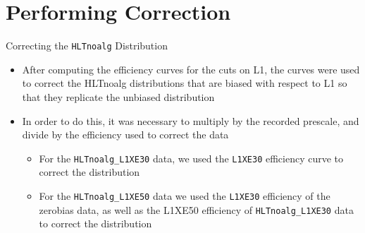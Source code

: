 \documentclass[]{beamer}
\begin{document}
\begin{frame}
\end{frame}
\begin{frame}
\end{frame}
\begin{frame}
\end{frame}
\section{Performing Correction}
\begin{frame}{Correcting the \texttt{HLTnoalg} Distribution}
		\begin{itemize}
				\item After computing the efficiency curves for the cuts on L1, the curves were used to correct the HLTnoalg distributions that are biased with respect to L1 so that they replicate the unbiased distribution
				\item In order to do this, it was necessary to multiply by the recorded prescale, and divide by the efficiency used to correct the data
				\begin{itemize}
						\item For the \texttt{HLTnoalg\_L1XE30} data, we used the \texttt{L1XE30} efficiency curve to correct the distribution
						\item For the \texttt{HLTnoalg\_L1XE50} data we used the \texttt{L1XE30} efficiency of the zerobias data, as well as the L1XE50 efficiency of \texttt{HLTnoalg\_L1XE30} data to correct the distribution
				\end{itemize}
		\end{itemize}
\end{frame}
\end{document}
